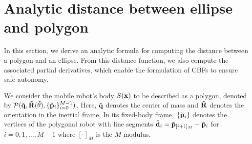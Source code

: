 \section{Analytic distance between ellipse and polygon}
\label{sec: analytic_distance}


In this section, we derive an analytic formula for computing the distance between a polygon and an ellipse. From this distance function, we also compute the associated partial derivatives, which enable the formulation of CBFs to ensure safe autonomy.




We consider the mobile robot's body $S(\mathbf{x})$ to be described as a polygon, denoted by ${\cal P}( \tilde{\mathbf{q}}, \tilde{\mathbf{R}}(\tilde{\theta}), \{\tilde{\mathbf{p}}_i\}_{i=0}^{M-1})$. Here, $\Tilde{\mathbf{q}}$ denotes the center of mass and $\Tilde{\mathbf{R}}$ denotes the orientation in the inertial frame. In its fixed-body frame, $\{\tilde{\mathbf{p}}_i\}$ denotes the vertices of the polygonal robot with line segments $\tilde{\mathbf{d}}_i = \tilde{\mathbf{p}}_{[i+1]_M} - \tilde{\mathbf{p}}_i$ for $i = 0, 1, \ldots, M-1$ where $[\cdot]_M$ is the $M$-modulus. 

